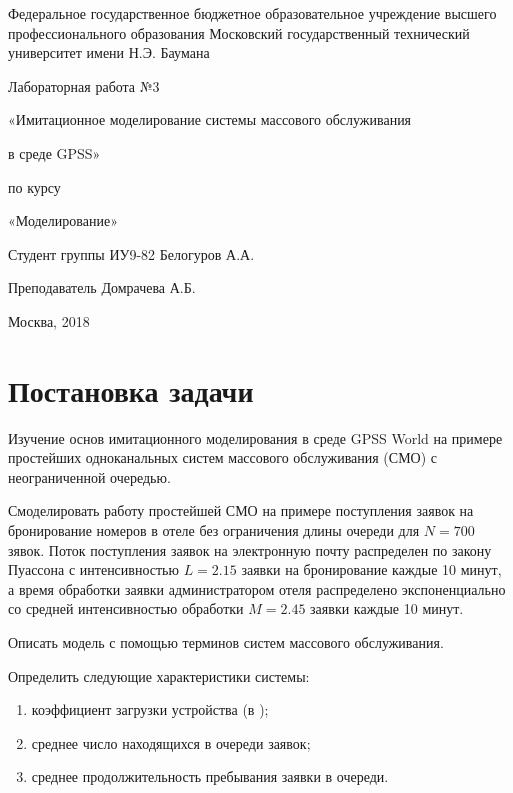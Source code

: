 \documentclass[a4paper, 12pt]{article}   	%
\begin{document}
\begin{titlepage}

\thispagestyle{empty}

\begin{center}
Федеральное государственное бюджетное образовательное учреждение высшего профессионального образования Московский государственный технический университет имени Н.Э. Баумана
\end{center}


\vfill

\centerline{\large{Лабораторная работа №3}}

\centerline{\large{«Имитационное моделирование системы массового обслуживания}} 
\centerline{\large{в среде GPSS»}}

\centerline{\large{по курсу}}
\centerline{\large{«Моделирование»}}


\vfill

Студент группы ИУ9-82 \hfill Белогуров А.А.

Преподаватель \hfill Домрачева А.Б.
\vfill

\centerline{Москва, 2018}
\clearpage
\end{titlepage}

\newpage
\setcounter{page}{2}

\tableofcontents

\newpage

\section{Постановка задачи}
    Изучение основ имитационного моделирования в среде GPSS World на примере простейших одноканальных систем массового обслуживания (СМО) с неограниченной очередью.
    
    Смоделировать работу простейшей СМО на примере поступления заявок на бронирование номеров в отеле без ограничения длины очереди для $N = 700$ зявок. Поток поступления заявок на электронную почту распределен по закону Пуассона с интенсивностью $L = 2.15$ заявки на бронирование каждые 10 минут, а время обработки заявки администратором отеля распределено экспоненциально со средней интенсивностью обработки $M=2.45$ заявки каждые 10 минут.
    
    Описать модель с помощью терминов систем массового обслуживания.
    
    Определить следующие характеристики системы:
    \begin{enumerate}
        \item коэффициент загрузки устройства (в \text{\%});
        \item среднее число находящихся в очереди заявок;
        \item среднее продолжительность пребывания заявки в очереди.
    \end{enumerate}
    
\end{document}
